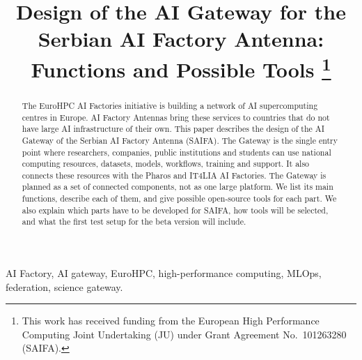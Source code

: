 \documentclass[conference,a4paper]{IEEEtran}
\begin{document}
\title{Design of the AI Gateway for the Serbian AI Factory Antenna: Functions and Possible Tools%
\thanks{This work has received funding from the European High Performance Computing Joint Undertaking (JU) under Grant Agreement No.~101263280 (SAIFA).}}

\author{
\and
{}
\and
{}
}

\maketitle
{}

\begin{abstract}
The EuroHPC AI Factories initiative is building a network of AI supercomputing centres in Europe. AI Factory Antennas bring these services to countries that do not have large AI infrastructure of their own. This paper describes the design of the AI Gateway of the Serbian AI Factory Antenna (SAIFA). The Gateway is the single entry point where researchers, companies, public institutions and students can use national computing resources, datasets, models, workflows, training and support. It also connects these resources with the Pharos and IT4LIA AI Factories. The Gateway is planned as a set of connected components, not as one large platform. We list its main functions, describe each of them, and give possible open-source tools for each part. We also explain which parts have to be developed for SAIFA, how tools will be selected, and what the first test setup for the beta version will include.
\end{abstract}

\begin{IEEEkeywords}
AI Factory, AI gateway, EuroHPC, high-performance computing, MLOps, federation, science gateway.
\end{IEEEkeywords}
\end{document}
